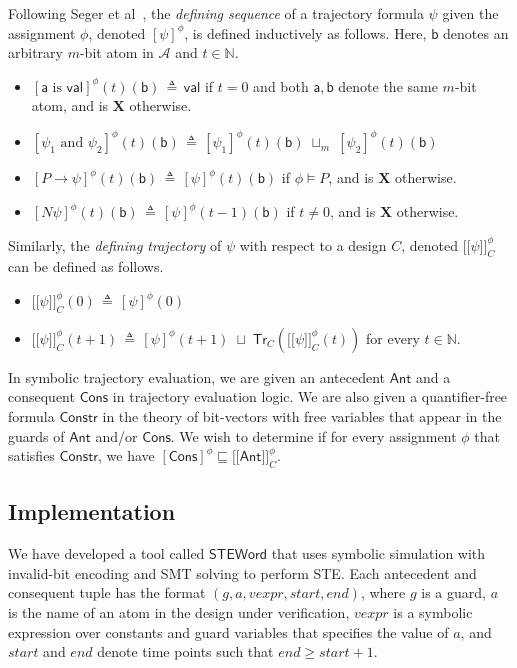 \documentclass{llncs}
\newcommand{\tr}{\ensuremath{\mathsf{Tr}}}
\newcommand{\isdef}{\ensuremath{\,\triangleq\,}}
\newcommand{\lsem}{\ensuremath{[\![}}
\newcommand{\rsem}{\ensuremath{]\!]}}
\newcommand{\ant}{\ensuremath{\mathsf{Ant}}}
\newcommand{\cons}{\ensuremath{\mathsf{Cons}}}
\newcommand{\constr}{\ensuremath{\mathsf{Constr}}}
\newcommand{\steword}{\ensuremath{\mathsf{STEWord}}}
\newcommand{\mc}[1]{\ensuremath{\mathcal{{#1}}}}
\begin{document}
Following Seger et al~\cite{BryantSeger90,SegerJOMABS05}, the
\emph{defining sequence} of a trajectory formula $\psi$ given the
assignment $\phi$, denoted $[\psi]^\phi$, is defined inductively as
follows.  Here, $\mathsf{b}$ denotes an arbitrary $m$-bit atom in
$\mc{A}$ and $t \in \mathbb{N}$.
\begin{itemize}
\item $[\mathsf{a} \text{ is } \mathsf{val}]^\phi(t)(\mathsf{b})
  \isdef \mathsf{val}$ if $t = 0$ and both $\mathsf{a}, \mathsf{b}$
  denote the same $m$-bit atom, and is $\mathbf{X}$ otherwise.
\item $[\psi_1 \text{ and } \psi_2]^\phi(t)(\mathsf{b}) \isdef [\psi_1]^\phi(t)(\mathsf{b}) \;\sqcup_m\; [\psi_2]^\phi(t)(\mathsf{b})$
\item $[P \rightarrow \psi]^\phi(t)(\mathsf{b}) \isdef [\psi]^\phi(t)(\mathsf{b})$ if $\phi \models P$, and is $\mathbf{X}$ otherwise.
\item $[N \psi]^\phi(t)(\mathsf{b}) \isdef
  [\psi]^\phi(t-1)(\mathsf{b})$ if $t \neq 0$, and is $\mathbf{X}$
  otherwise.
\end{itemize}
Similarly, the \emph{defining trajectory} of $\psi$ with respect to
a design $C$, denoted $\lsem \psi \rsem_C^\phi$ can be defined as
follows.
\begin{itemize}
\item $\lsem \psi \rsem_C^\phi(0) \isdef [\psi]^\phi(0)$
\item $\lsem \psi \rsem_C^\phi(t+1) \isdef [\psi]^\phi(t+1) \;\sqcup\;  {\tr}_C(\lsem \psi \rsem_C^\phi(t))$ for every $t \in \mathbb{N}$.
\end{itemize}
In symbolic trajectory evaluation, we are given an antecedent $\ant$
and a consequent $\cons$ in trajectory evaluation logic.  We are also
given a quantifier-free formula $\constr$ in the theory of bit-vectors
with free variables that appear in the guards of $\ant$ and/or
$\cons$.  We wish to determine if for every assignment $\phi$ that
satisfies $\constr$, we have $[\cons]^\phi \sqsubseteq \lsem \ant
\rsem_C^\phi$.



\subsection{Implementation}
We have developed a tool called {\steword} that uses symbolic
simulation with invalid-bit encoding and SMT solving to perform STE.
Each antecedent and consequent tuple has the format $(g,
a, vexpr, start, end)$, where $g$ is a guard, $a$ is the name of an
atom in the design under verification, $vexpr$ is a symbolic
expression over constants and guard variables that specifies the value
of $a$, and $start$ and $end$ denote time points such that $end \ge
start + 1$.
\end{document}
